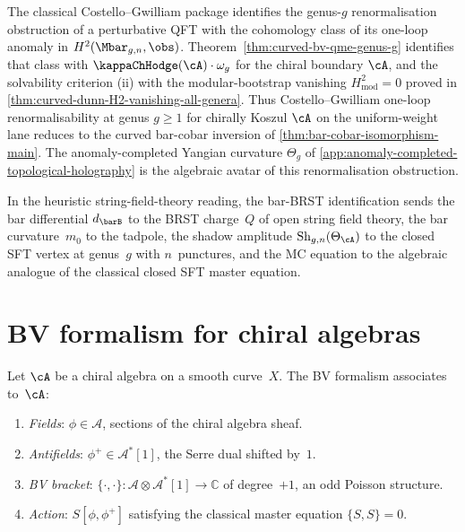 \begin{remark}[Costello--Gwilliam one-loop renormalisation
 $=$ modular bootstrap]
\label{rem:costello-gwilliam-modular-bootstrap}
The classical Costello--Gwilliam package identifies the genus-$g$
renormalisation obstruction of a perturbative QFT with the
cohomology class of its one-loop anomaly in
$H^{2}(\Mbar_{g,n},\obs)$. Theorem~\ref{thm:curved-bv-qme-genus-g}
identifies that class with $\kappaChHodge(\cA)\cdot\omega_g$ for the chiral
boundary $\cA$, and the solvability criterion (ii) with the
modular-bootstrap vanishing
$H^{2}_{\mathrm{mod}}=0$ proved in
\autoref{thm:curved-dunn-H2-vanishing-all-genera}. Thus
Costello--Gwilliam one-loop renormalisability at genus $g\ge 1$
for chirally Koszul $\cA$ on the uniform-weight lane reduces to the
curved bar-cobar inversion of
\autoref{thm:bar-cobar-isomorphism-main}. The anomaly-completed
Yangian curvature $\Theta_g$ of
\autoref{app:anomaly-completed-topological-holography} is the
algebraic avatar of this renormalisation obstruction.
\end{remark}

\begin{remark}
\label{rem:sft-bar-identification}
In the heuristic string-field-theory reading, the bar-BRST
identification sends the bar differential $d_{\barB}$ to the BRST
charge~$Q$ of open string field theory, the bar curvature~$m_0$ to
the tadpole, the shadow amplitude $\mathrm{Sh}_{g,n}(\Theta_\cA)$ to
the closed SFT vertex at genus~$g$ with $n$~punctures, and the MC
equation to the algebraic analogue of the classical closed SFT master
equation.
\end{remark}

\section{BV formalism for chiral algebras}

\begin{definition}
\label{def:bv-data-chiral}
Let $\cA$ be a chiral algebra on a smooth curve~$X$.
The BV formalism associates to~$\cA$:
\begin{enumerate}[label=\textup{(\roman*)}]
\item \emph{Fields}: $\phi \in \mathcal{A}$, sections of the chiral algebra sheaf.
\item \emph{Antifields}: $\phi^+ \in \mathcal{A}^*[1]$, the Serre dual shifted by~$1$.
\item \emph{BV bracket}: $\{\cdot, \cdot\}\colon \mathcal{A} \otimes \mathcal{A}^*[1] \to \mathbb{C}$ of degree~$+1$, an odd Poisson structure.
\item \emph{Action}: $S[\phi, \phi^+]$ satisfying the classical master equation $\{S, S\} = 0$.
\end{enumerate}
\end{definition}

